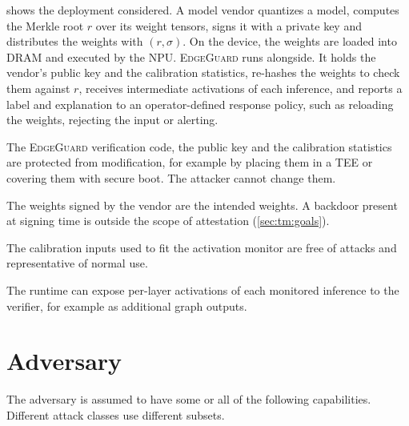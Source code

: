  shows the deployment considered. A model vendor quantizes a model,
computes the Merkle root $r$ over its weight tensors, signs it with a private key and
distributes the weights with $(r,\sigma)$. On the device, the weights are loaded into DRAM and
executed by the NPU. \textsc{EdgeGuard} runs alongside. It holds the vendor's public key and
the calibration statistics, re-hashes the weights to check them against $r$, receives
intermediate activations of each inference, and reports a label and explanation to an
operator-defined response policy, such as reloading the weights, rejecting the input or
alerting.

\begin{assumption}\label{as:trusted}
The \textsc{EdgeGuard} verification code, the public key and the calibration statistics are
protected from modification, for example by placing them in a TEE or covering them with
secure boot. The attacker cannot change them.
\end{assumption}

\begin{assumption}\label{as:honest}
The weights signed by the vendor are the intended weights. A backdoor present at signing time is
outside the scope of attestation (\cref{sec:tm:goals}).
\end{assumption}

\begin{assumption}\label{as:calib}
The calibration inputs used to fit the activation monitor are free of attacks and representative
of normal use.
\end{assumption}

\begin{assumption}\label{as:access}
The runtime can expose per-layer activations of each monitored inference to the verifier, for
example as additional graph outputs.
\end{assumption}

\section{Adversary}
\label{sec:tm:adversary}

The adversary is assumed to have some or all of the following capabilities. Different attack
classes use different subsets.

